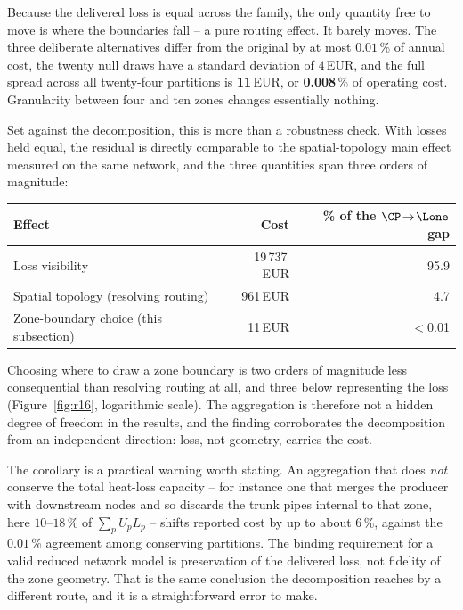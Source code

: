 Because the delivered loss is equal across the family, the only quantity free to move is
where the boundaries fall -- a pure routing effect. It barely moves. The three deliberate
alternatives differ from the original by at most $0.01$\,\% of annual cost, the twenty null
draws have a standard deviation of $4$\,EUR, and the full spread across all twenty-four
partitions is \textbf{11}\,EUR, or \textbf{0.008}\,\% of operating cost. Granularity between
four and ten zones changes essentially nothing.

Set against the decomposition, this is more than a robustness check. With losses held
equal, the residual is directly comparable to the spatial-topology main effect measured on
the same network, and the three quantities span three orders of magnitude:

\begin{center}\footnotesize
\begin{tabular}{lrr}
\hline
Effect & Cost & \% of the $\CP\!\to\!\Lone$ gap \\
\hline
Loss visibility & 19\,737\,EUR & 95.9 \\
Spatial topology (resolving routing) & 961\,EUR & 4.7 \\
Zone-boundary choice (this subsection) & 11\,EUR & $<$0.01 \\
\hline
\end{tabular}
\end{center}

Choosing where to draw a zone boundary is two orders of magnitude less consequential than
resolving routing at all, and three below representing the loss
(Figure~\ref{fig:r16}, logarithmic scale). The aggregation is therefore not a hidden degree
of freedom in the results, and the finding corroborates the decomposition from an
independent direction: loss, not geometry, carries the cost.

The corollary is a practical warning worth stating. An aggregation that does \emph{not}
conserve the total heat-loss capacity -- for instance one that merges the producer with
downstream nodes and so discards the trunk pipes internal to that zone, here $10$--$18$\,\%
of $\sum_p U_p L_p$ -- shifts reported cost by up to about $6$\,\%, against the $0.01$\,\%
agreement among conserving partitions. The binding requirement for a valid reduced network
model is preservation of the delivered loss, not fidelity of the zone geometry. That is the
same conclusion the decomposition reaches by a different route, and it is a straightforward
error to make.


